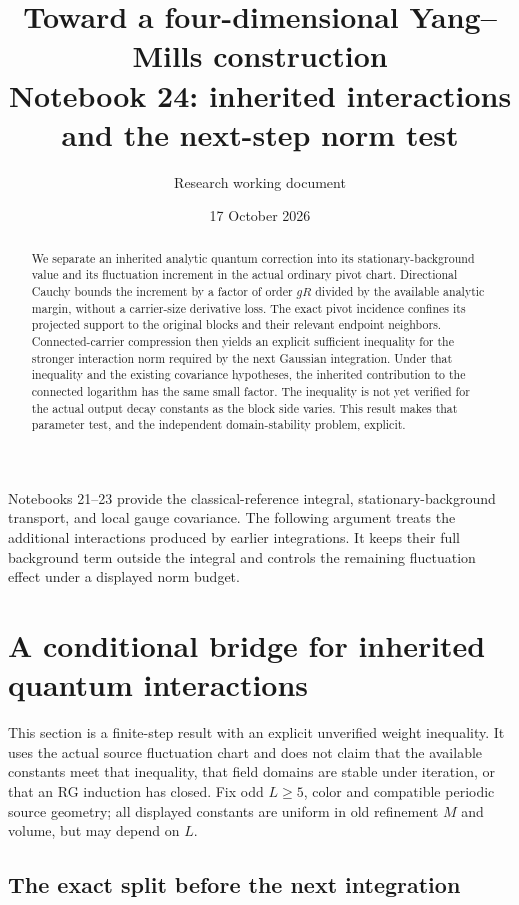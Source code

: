 \documentclass[11pt]{article}
\title{Toward a four-dimensional Yang--Mills construction\\
\large Notebook 24: inherited interactions and the next-step norm test}
\author{Research working document}
\date{17 October 2026}
\theoremstyle{remark}
\begin{document}
\maketitle
\begin{abstract}
We separate an inherited analytic quantum correction into its
stationary-background value and its fluctuation increment in
the actual ordinary pivot chart. Directional Cauchy bounds the
increment by a factor of order $gR$ divided by the available
analytic margin, without a carrier-size derivative loss.
The exact pivot incidence confines its projected support to
the original blocks and their relevant endpoint neighbors.
Connected-carrier compression then yields an explicit
sufficient inequality for the stronger interaction norm
required by the next Gaussian integration. Under that
inequality and the existing covariance hypotheses, the
inherited contribution to the connected logarithm has the
same small factor. The inequality is not yet verified for
the actual output decay constants as the block side varies.
This result makes that parameter test, and the independent
domain-stability problem, explicit.
\end{abstract}

Notebooks 21--23 provide the classical-reference integral,
stationary-background transport, and local gauge covariance.
The following argument treats the additional interactions
produced by earlier integrations. It keeps their full
background term outside the integral and controls the
remaining fluctuation effect under a displayed norm budget.


\section{A conditional bridge for inherited quantum interactions}
\label{qi-section}

This section is a finite-step result with an explicit unverified
weight inequality. It uses the actual source fluctuation chart and
does not claim that the available constants meet that inequality,
that field domains are stable under iteration, or that an RG
induction has closed. Fix odd $L\ge5$, color and compatible periodic source
geometry; all displayed constants are uniform in old refinement
$M$ and volume, but may depend on $L$.

\subsection{The exact split before the next integration}
\end{document}
